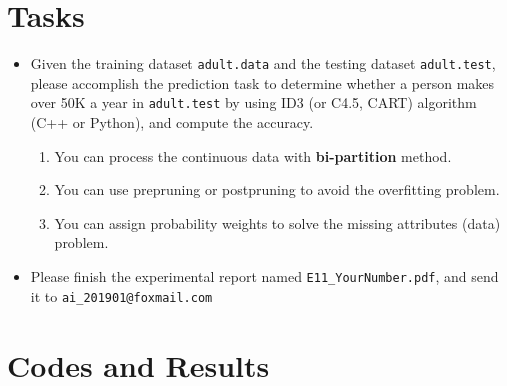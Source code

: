 \documentclass[a4paper, 11pt]{article}
\begin{document}
\section{Tasks}
\begin{itemize}
\item Given the training dataset \texttt{adult.data} and the testing dataset \texttt{adult.test}, please accomplish the prediction task to determine whether a person makes over 50K a year in \texttt{adult.test} by using ID3 (or C4.5, CART) algorithm (C++ or Python), and compute the accuracy.
\begin{enumerate}
\item You can process the continuous data with \textbf{bi-partition} method.
\item You can use prepruning or postpruning to avoid the overfitting problem.
\item You can assign probability weights to solve the missing attributes (data) problem.
\end{enumerate}

\item Please finish the experimental report named \texttt{E11\_YourNumber.pdf}, and send it to \texttt{ai\_201901@foxmail.com}
\end{itemize}

\section{Codes and Results}
\begin{lstlisting}

\end{lstlisting}
\end{document}
